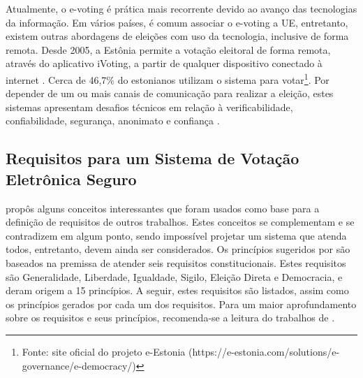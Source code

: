 \documentclass[portuguese]{textolivre}
\begin{document}
	Atualmente, o e-voting é prática mais recorrente devido ao avanço das tecnologias da informação. Em vários países, é comum associar o e-voting a UE, entretanto, existem outras abordagens de eleições com uso da tecnologia, inclusive de forma remota. Desde 2005, a Estônia permite a votação eleitoral de forma remota, através do aplicativo iVoting, a partir de qualquer dispositivo conectado à internet \cite{fornasier2022democracia}. Cerca de 46,7\% do estonianos utilizam o sistema para votar\footnote{Fonte: site oficial do projeto e-Estonia (https://e-estonia.com/solutions/e-governance/e-democracy/)}. Por depender de um ou mais canais de comunicação para realizar a eleição, estes sistemas apresentam desafios técnicos em relação à verificabilidade, confiabilidade, segurança, anonimato e confiança \cite{gibson2016review}.
	
	
	
	
	\subsection{Requisitos para um Sistema de Votação Eletrônica Seguro}\label{requisitos-eleicao}
	
	\textcite{gritzalis2002principles} propôs alguns conceitos interessantes que foram usados como base para a definição de requisitos de outros trabalhos. Estes conceitos se complementam e se contradizem em algum ponto, sendo impossível projetar um sistema que atenda todos, entretanto, devem ainda ser considerados. Os princípios sugeridos por \textcite{gritzalis2002principles} são baseados na premissa de atender seis requisitos constitucionais. Estes requisitos são Generalidade, Liberdade, Igualdade, Sigilo, Eleição Direta e Democracia, e deram origem a 15 princípios. A seguir, estes requisitos são listados, assim como os princípios gerados por cada um dos requisitos. Para um maior aprofundamento sobre os requisitos e seus princípios, recomenda-se a leitura do trabalhos de \textcite{Soares_Vasconcelos_2023, gritzalis2002principles}.
	
\end{document}
